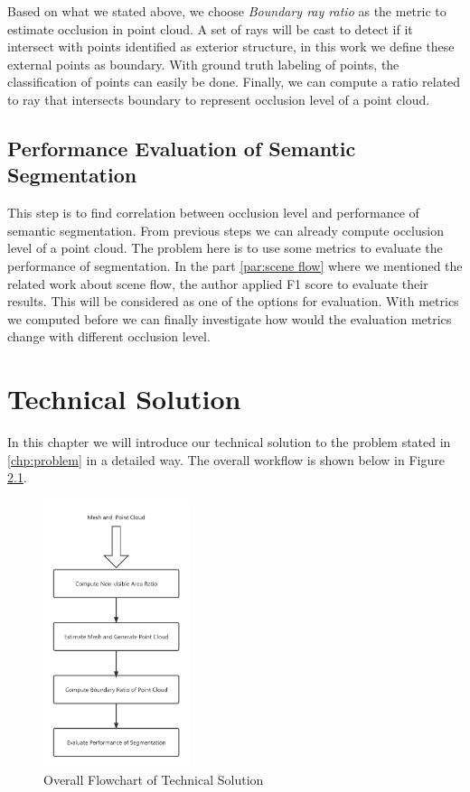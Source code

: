 \documentclass[11pt, a4paper,oneside,chapterprefix=false]{scrbook}
\begin{document}
Based on what we stated above, we choose \textit{Boundary ray ratio} as the metric to estimate occlusion in point cloud. A set of rays will be cast to detect if it intersect with points identified as exterior structure, in this work we define these external points as boundary. With ground truth labeling of points, the classification of points can easily be done. Finally, we can compute a ratio related to ray that intersects boundary to represent occlusion level of a point cloud. 

\section{Performance Evaluation of Semantic Segmentation} \label{sec:performance evaluation}

This step is to find correlation between occlusion level and performance of semantic segmentation. From previous steps we can already compute occlusion level of a point cloud. The problem here is to use some metrics to evaluate the performance of segmentation. In the part \ref{par:scene flow} where we mentioned the related work about scene flow, the author applied F1 score to evaluate their results. This will be considered as one of the options for evaluation. With metrics we computed before we can finally investigate how would the evaluation metrics change with different occlusion level. 

\chapter{Technical Solution} \label{chp:solution}

In this chapter we will introduce our technical solution to the problem stated in \ref{chp:problem} in a detailed way. The overall workflow is shown below in Figure \ref{fig:overall flowchart of technical solution}.

\begin{figure}[H]
    \centering
    \includegraphics*[width=0.38\textwidth]{figures/technical solution flowchart.png}
    \caption{Overall Flowchart of Technical Solution}
    \label{fig:overall flowchart of technical solution}
\end{figure}
\end{document}
